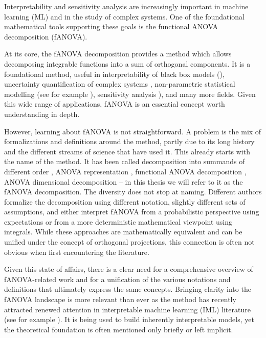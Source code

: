 Interpretability and sensitivity analysis are increasingly important in machine learning (ML) and in the study of complex systems. One of the foundational mathematical tools supporting these goals is the functional ANOVA decomposition (fANOVA).

At its core, the fANOVA decomposition provides a method which allows decomposing integrable functions into a sum of orthogonal components.
It is a foundational method, useful in interpretability of black box models (\cite{hooker2004, molnar2025}), uncertainty quantification of complex systems \cite{rahman2014}, non-parametric statistical modelling (see for example \cite{stone1997}), sensitivity analysis \cite{sobol1993sensitivity}), and many more fields.
Given this wide range of applications, fANOVA is an essential concept worth understanding in depth.\par

However, learning about fANOVA is not straightforward.
A problem is the mix of formalizations and definitions around the method, partly due to its long history and the different streams of science that have used it.
This already starts with the name of the method. It has been called decomposition into summands of different order \citep{sobol1993sensitivity}, ANOVA representation \citep{sobol1993sensitivity}, functional ANOVA decomposition \citep{hooker2004}, ANOVA dimensional decomposition \citep{rahman2014} – in this thesis we will refer to it as the fANOVA decomposition.
The diversity does not stop at naming. Different authors formalize the decomposition using different notation, slightly different sets of assumptions, and either interpret fANOVA from a probabilistic perspective using expectations or from a more deterministic mathematical viewpoint using integrals.
While these approaches are mathematically equivalent and can be unified under the concept of orthogonal projections, this connection is often not obvious when first encountering the literature.\par


Given this state of affairs, there is a clear need for a comprehensive overview of fANOVA-related work and for a unification of the various notations and definitions that ultimately express the same concepts.
Bringing clarity into the fANOVA landscape is more relevant than ever as the method has recently attracted renewed attention in interpretable machine learning (IML) literature (see for example \cite{hu2025}).
It is being used to build inherently interpretable models, yet the theoretical foundation is often mentioned only briefly or left implicit.\par

